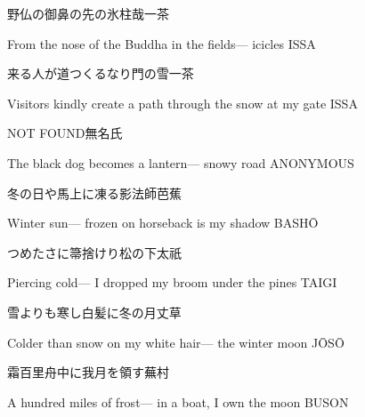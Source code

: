 \begin{haiku}
    {\FH 野仏の御鼻の先の氷柱哉}\hfill{\FH 一茶}

    \vin{} From the nose
    \vin{} \vin{} of the Buddha in the fields---
    \vin{} \vin{} \vin{} icicles \hspace{\fill} ISSA
\end{haiku}

\begin{haiku}
    {\FH 来る人が道つくるなり門の雪}\hfill{\FH 一茶}

    \vin{} Visitors
    \vin{} \vin{} kindly create a path
    \vin{} \vin{} \vin{} through the snow at my gate \hspace{\fill} ISSA
\end{haiku}

\begin{haiku}
    {NOT FOUND}\hfill{\FH 無名氏}

    \vin{} The black dog
    \vin{} \vin{} becomes a lantern---
    \vin{} \vin{} \vin{} snowy road \hspace{\fill} ANONYMOUS
\end{haiku}

\begin{haiku}
    {\FH 冬の日や馬上に凍る影法師}\hfill{\FH 芭蕉}

    \vin{} Winter sun---
    \vin{} \vin{} frozen on horseback
    \vin{} \vin{} \vin{} is my shadow \hspace{\fill} BASH\={O}
\end{haiku}

\begin{haiku}
    {\FH つめたさに箒捨けり松の下}\hfill{\FH 太祇}

    \vin{} Piercing cold---
    \vin{} \vin{} I dropped my broom
    \vin{} \vin{} \vin{} under the pines \hspace{\fill} TAIGI
\end{haiku}

\begin{haiku}
    {\FH 雪よりも寒し白髪に冬の月}\hfill{\FH 丈草}

    \vin{} Colder than snow
    \vin{} \vin{} on my white hair---
    \vin{} \vin{} \vin{} the winter moon \hspace{\fill} J\={O}S\={O}
\end{haiku}

\begin{haiku}
    {\FH 霜百里舟中に我月を領す}\hfill{\FH 蕪村}

    \vin{} A hundred miles of frost---
    \vin{} \vin{} in a boat, I own
    \vin{} \vin{} \vin{} the moon \hspace{\fill} BUSON
\end{haiku}

